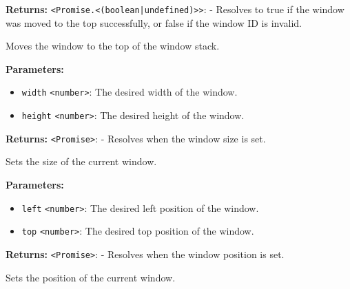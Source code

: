 \documentclass[12pt,a4paper]{article}
\begin{document}
\vspace{5mm}
\noindent {}


\noindent \textbf{Returns:} \texttt{<Promise.<(boolean|undefined)>>}: - Resolves to \textasciigrave{}true\textasciigrave{} if the window was moved to the top successfully, or \textasciigrave{}false\textasciigrave{} if the window ID is invalid.

\noindent Moves the window to the top of the window stack.

\vspace{5mm}
\noindent {}


\noindent \textbf{Parameters:}
\begin{itemize}
  \item \texttt{width} \texttt{<number>}: The desired width of the window.
  \item \texttt{height} \texttt{<number>}: The desired height of the window.
\end{itemize}

\noindent \textbf{Returns:} \texttt{<Promise>}: - Resolves when the window size is set.

\noindent Sets the size of the current window.

\vspace{5mm}
\noindent {}


\noindent \textbf{Parameters:}
\begin{itemize}
  \item \texttt{left} \texttt{<number>}: The desired left position of the window.
  \item \texttt{top} \texttt{<number>}: The desired top position of the window.
\end{itemize}

\noindent \textbf{Returns:} \texttt{<Promise>}: - Resolves when the window position is set.

\noindent Sets the position of the current window.

\vspace{5mm}
\noindent {}
\end{document}
